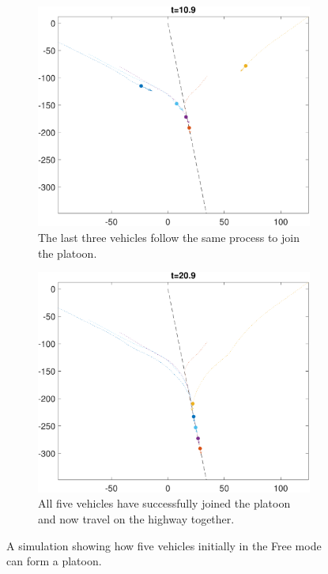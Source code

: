 \begin{figure}
    \begin{subfigure}[t]{0.45\columnwidth} \label{subfig:fp_110}
        \includegraphics[width=\columnwidth]{fig/fp_110}
        \caption{The last three vehicles follow the same process to join the platoon.}
    \end{subfigure}
    \begin{subfigure}[t]{0.45\columnwidth} \label{subfig:fp_210}
        \includegraphics[width=\columnwidth]{fig/fp_210}
        \caption{All five vehicles have successfully joined the platoon and now travel on the highway together.}
    \end{subfigure}   
    \caption{A simulation showing how five vehicles initially in the Free mode can form a platoon. \label{fig:fp}}
\end{figure}

